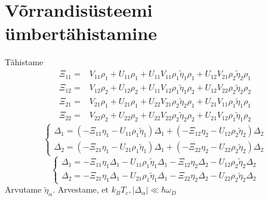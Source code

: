 \documentclass[class=article, crop=false]{standalone}
\begin{document}
\section{Võrrandisüsteemi ümbertähistamine}
Tähistame
\begin{equation}\label{key}
	\begin{split}
		\Xi_{11} = & V_{ 1 1} \rho_{ 1} + U_{ 1 1} \rho_{ 1} + U_{ 1 1} V_{ 1 1} \rho_{ 1} \tilde{ \eta}_{ 1} \rho_{ 1} + U_{ 1 2} V_{ 2 1} \rho_{ 2} \tilde{ \eta}_{ 2} \rho_{ 1} \\
		\Xi_{12} = & V_{ 1 2} \rho_{ 2} + U_{ 1 2} \rho_{ 2} + U_{ 1 1} V_{ 1 2} \rho_{ 1} \tilde{ \eta}_{ 1} \rho_{ 2} +  U_{ 1 2} V_{ 2 2} \rho_{ 2} \tilde{ \eta}_{ 2} \rho_{ 2} \\
		\Xi_{21} = & V_{ 2 1} \rho_{ 1} + U_{ 2 1} \rho_{ 1} + U_{ 2 2} V_{ 2 1} \rho_{ 2} \tilde{ \eta}_{ 2} \rho_{ 1} + U_{ 2 1} V_{ 1 1} \rho_{ 1} \tilde{ \eta}_{ 1} \rho_{ 1} \\
		\Xi_{22} = & V_{ 2 2} \rho_{ 2} + U_{ 2 2} \rho_{ 2} + U_{ 2 2} V_{ 2 2} \rho_{ 2} \tilde{ \eta}_{ 2} \rho_{ 2} + U_{ 2 1} V_{ 1 2} \rho_{ 1} \tilde{ \eta}_{ 1} \rho_{ 2}
	\end{split}
\end{equation}
\begin{equation}\label{key}
	\begin{cases}
		\Delta_{1} = ( - \Xi_{11} \eta_{ 1} - U_{ 1 1} \rho_{ 1} \tilde{ \eta}_{ 1} ) \Delta_{1} + ( - \Xi_{12} \eta_{ 2} - U_{ 1 2} \rho_{ 2} \tilde{ \eta}_{ 2} )\Delta_{2} \\
		\Delta_{2} = ( - \Xi_{21} \eta_{ 1} - U_{ 2 1} \rho_{ 1} \tilde{ \eta}_{ 1} )  \Delta_{1} + ( - \Xi_{22} \eta_{ 2} - U_{ 2 2} \rho_{ 2} \tilde{ \eta}_{ 2} ) \Delta_{2}
	\end{cases}
\end{equation}
\begin{equation}\label{key}
	\begin{cases}
		\Delta_{1} = - \Xi_{11} \eta_{ 1} \Delta_{1} - U_{ 1 1} \rho_{ 1} \tilde{ \eta}_{ 1} \Delta_{1} - \Xi_{12} \eta_{ 2} \Delta_{2} - U_{ 1 2} \rho_{ 2} \tilde{ \eta}_{ 2} \Delta_{2} \\
		\Delta_{2} = - \Xi_{21} \eta_{ 1} \Delta_{1} - U_{ 2 1} \rho_{ 1} \tilde{ \eta}_{ 1} \Delta_{1} - \Xi_{22} \eta_{ 2} \Delta_{2} - U_{ 2 2} \rho_{ 2} \tilde{ \eta}_{ 2} \Delta_{2}
	\end{cases}
\end{equation}
Arvutame $ \tilde{ \eta}_{ \alpha} $. Arvestame, et $ k_{B} T_{c}, | \Delta_{ \alpha}| \ll \hbar \omega_{D} $
\end{document}
